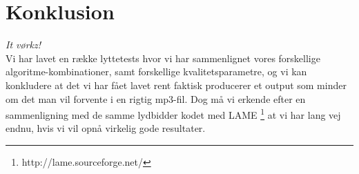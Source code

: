 \section{Konklusion}
\textit{It vørkz!}\\
Vi har lavet en række lyttetests hvor vi har sammenlignet vores
forskellige algoritme-kombinationer, samt forskellige
kvalitetsparametre, og vi kan konkludere at det vi har fået lavet rent
faktisk producerer et output som minder om det man vil forvente i en
rigtig mp3-fil. Dog må vi erkende efter en sammenligning med de samme
lydbidder kodet med LAME \footnote{http://lame.sourceforge.net/} at vi
har lang vej endnu, hvis vi vil opnå virkelig gode resultater.
